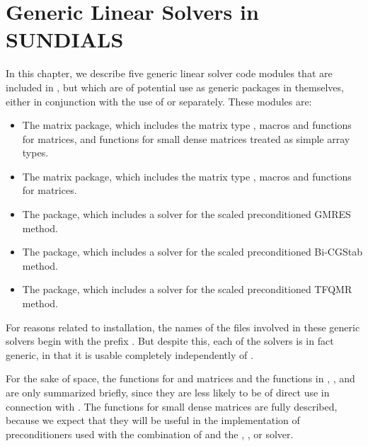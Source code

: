 \chapter{Generic Linear Solvers in SUNDIALS}\label{s:gen_linsolv}
In this chapter, we describe five generic linear solver code modules that 
are included in {\cvode}, but which are of potential use as generic packages in
themselves, either in conjunction with the use of {\cvode} or separately.
These modules are:
\begin{itemize}
\item The {\dense} matrix package, which includes the matrix type ,
      macros and functions for  matrices, and functions
      for small dense matrices treated as simple array types.
\item The {\band} matrix package, which includes the matrix type ,
      macros and functions for  matrices.
\item The {\spgmr} package, which includes a solver for the scaled
      preconditioned GMRES method.
\item The {\spbcg} package, which includes a solver for the scaled
      preconditioned Bi-CGStab method.
\item The {\sptfqmr} package, which includes a solver for the scaled
      preconditioned TFQMR method.
\end{itemize}

For reasons related to installation, the names of the files involved
in these generic solvers begin with the prefix .  But
despite this, each of the solvers is in fact generic, in that it is
usable completely independently of {\sundials}.

For the sake of space, the functions for  and
 matrices and the functions in {\spgmr}, {\spbcg}, and {\sptfqmr}
are only summarized briefly, since they are less likely to be of direct use
in connection with {\cvode}.  The functions for small dense matrices are fully
described, because we expect that they will be useful in the
implementation of preconditioners used with the combination of {\cvode}
and the {\cvspgmr}, {\cvspbcg}, or {\cvsptfqmr} solver.








